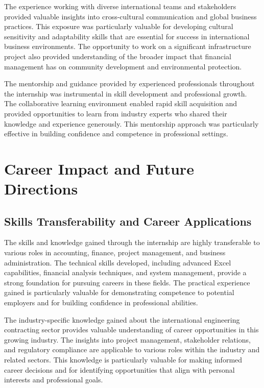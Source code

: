 The experience working with diverse international teams and stakeholders provided valuable insights into cross-cultural communication and global business practices. This exposure was particularly valuable for developing cultural sensitivity and adaptability skills that are essential for success in international business environments. The opportunity to work on a significant infrastructure project also provided understanding of the broader impact that financial management has on community development and environmental protection.

The mentorship and guidance provided by experienced professionals throughout the internship was instrumental in skill development and professional growth. The collaborative learning environment enabled rapid skill acquisition and provided opportunities to learn from industry experts who shared their knowledge and experience generously. This mentorship approach was particularly effective in building confidence and competence in professional settings.

\vspace{0.5em}
\section{Career Impact and Future Directions}

\subsection{Skills Transferability and Career Applications}
The skills and knowledge gained through the internship are highly transferable to various roles in accounting, finance, project management, and business administration. The technical skills developed, including advanced Excel capabilities, financial analysis techniques, and system management, provide a strong foundation for pursuing careers in these fields. The practical experience gained is particularly valuable for demonstrating competence to potential employers and for building confidence in professional abilities.

The industry-specific knowledge gained about the international engineering contracting sector provides valuable understanding of career opportunities in this growing industry. The insights into project management, stakeholder relations, and regulatory compliance are applicable to various roles within the industry and related sectors. This knowledge is particularly valuable for making informed career decisions and for identifying opportunities that align with personal interests and professional goals.

